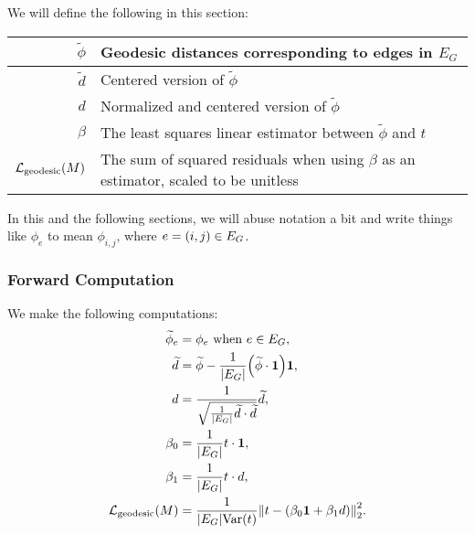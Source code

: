 We will define the following in this section: \begin{center}\begin{tabular}{r|l}
	\(\widetilde{\phi}\) & Geodesic distances corresponding to edges in \(E_G\) \\ \hline
	\(\widetilde{d}\) & Centered version of \(\widetilde{\phi}\) \\ \hline
	\(d\) & Normalized and centered version of \(\widetilde{\phi}\) \\ \hline
	\(\beta\) & The least squares linear estimator between \(\widetilde{\phi}\) and \(t\) \\ \hline
	\(\mathcal{L}_{\mathrm{geodesic}}\pof{M}\) & The sum of squared residuals when using \(\beta\) as an estimator, scaled to be unitless
\end{tabular}\end{center} In this and the following sections, we will abuse notation a bit and write things like \(\phi_e\) to mean \(\phi_{i, j}\), where \(e = \pof{i, j} \in E_G\).

\subsubsection{Forward Computation}
We make the following computations: \begin{align*}
	\widetilde{\phi}_e &= \phi_e \text{ when \(e \in E_G\)}, \\
	\widetilde{d} &= \widetilde{\phi} - \frac{1}{\abs{E_G}}\pof{\widetilde{\phi} \cdot \mathbf{1}}\mathbf{1}, \\
	d &= \frac{1}{\sqrt{\frac{1}{\abs{E_G}}\widetilde{d} \cdot \widetilde{d}}}\widetilde{d}, \\
	\beta_0 &= \frac{1}{\abs{E_G}}t \cdot \mathbf{1}, \\
	\beta_1 &= \frac{1}{\abs{E_G}}t \cdot d, \\
	\mathcal{L}_{\mathrm{geodesic}}\pof{M} &= \frac{1}{\abs{E_G}\Var\pof{t}}\norm{t - \pof{\beta_0\mathbf{1} + \beta_1d}}_2^2. \\
\end{align*}

